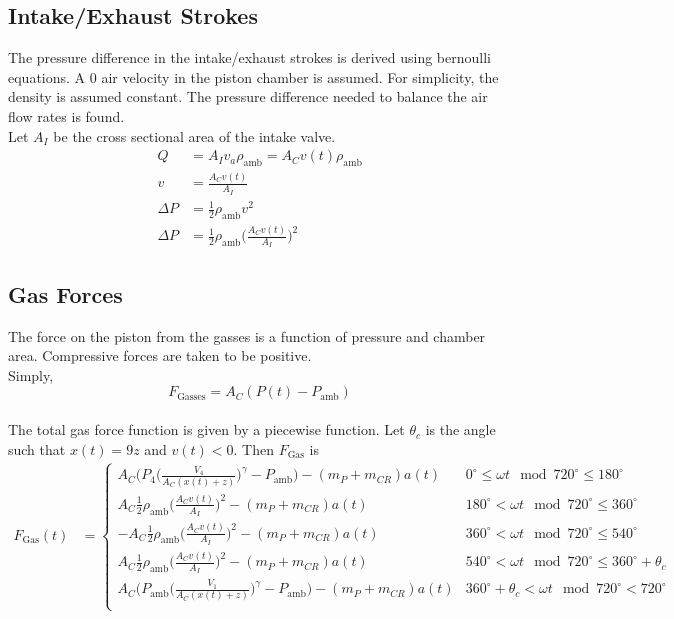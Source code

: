 \documentclass[10pt,a4paper]{article}
\begin{document}
\subsection*{Intake/Exhaust Strokes}
The pressure difference in the intake/exhaust strokes is derived using bernoulli equations. A 0 air velocity in the piston chamber is assumed. For simplicity, the density is assumed constant. The pressure difference needed to balance the air flow rates is found. \\ Let $A_I$ be the cross sectional area of the intake valve.
\begin{align}
	Q &= A_I v_a \rho_{\text{amb}} = A_C v(t)\rho_{\text{amb}}\\
	v &= \frac{A_C v(t)}{A_I}\\
	\Delta P &= \frac{1}{2} \rho_{\text{amb}} v^2 \\
	\Delta P &= \frac{1}{2} \rho_{\text{amb}} \Big( \frac{A_C v(t)}{A_I} \Big)^2
\end{align}
\subsection*{Gas Forces}
The force on the piston from the gasses is a function of pressure and chamber area. Compressive forces are taken to be positive. \\
 Simply, $$F_{\text{Gasses}} = A_C (P(t) - P_{\text{amb}})$$\\
 The total gas force function is given by a piecewise function. Let $\theta_c$ is the angle such that $x(t) = 9z$ and $v(t) < 0$. Then  $F_{\text{Gas}}$ is
\begin{align}
F_{\text{Gas}}(t) &=
\begin{cases}
A_C \Big(P_{4} \Big( \frac{V_4}{A_C (x(t)+z)} \Big)^{\gamma} - P_{\text{amb}}\Big) - (m_P+m_{CR})a(t) & 0^\circ \leq \omega t \mod 720^\circ \leq 180^\circ \\
A_C \frac{1}{2} \rho_{\text{amb}} \Big( \frac{A_C v(t)}{A_I} \Big)^2 - (m_P+m_{CR})a(t) & 180^\circ < \omega t \mod 720^\circ \leq 360^\circ \\
- A_C \frac{1}{2} \rho_{\text{amb}} \Big( \frac{A_C v(t)}{A_I} \Big)^2 - (m_P+m_{CR})a(t) & 360^\circ < \omega t \mod 720^\circ \leq 540^\circ \\
A_C \frac{1}{2} \rho_{\text{amb}} \Big( \frac{A_C v(t)}{A_I} \Big)^2 - (m_P+m_{CR})a(t) & 540^\circ < \omega t \mod 720^\circ \leq 360^\circ + \theta_c \\
A_C \Big( P_{\text{amb}} \Big( \frac{V_1}{A_C (x(t)+z)} \Big)^{\gamma}- P_{\text{amb}}\Big) - (m_P+m_{CR})a(t) & 360^\circ + \theta_c < \omega t \mod 720^\circ < 720^\circ \\
\end{cases}
\end{align}
\end{document}
